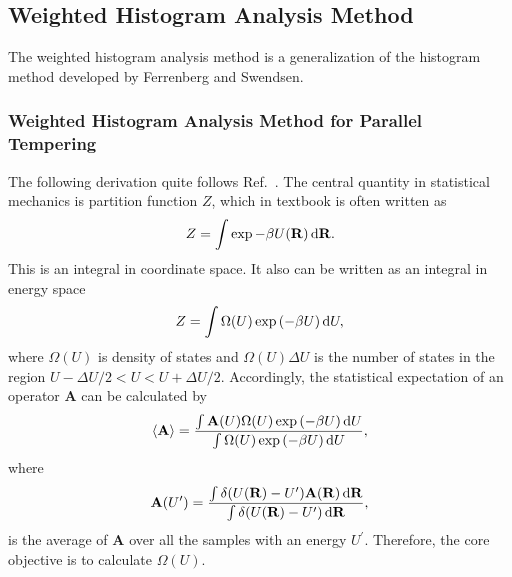 \subsection{Weighted Histogram Analysis Method\label{Sec:FEM:WHAM}}
The weighted histogram analysis method is a generalization of the histogram method developed by Ferrenberg and Swendsen.\cite{FerrenbergPRL1989}
\subsubsection{Weighted Histogram Analysis Method for Parallel Tempering\label{Sec:FEM:WHAM_REMD}}
The following derivation quite follows Ref.~\cite{ChoderaJCTC2007}.
The central quantity in statistical mechanics is partition function $Z$, which in textbook is often written as
\begin{equation}
Z=\int \exp{-\beta U(\mathbf{R})}\mathop{}\!\mathrm{d}\mathbf{R}.
\end{equation}
This is an integral in coordinate space. It also can be written as an integral in energy space
\begin{equation}
Z=\int \Omega(U)\exp{(-\beta U)}\mathop{}\!\mathrm{d} U,
\end{equation}
where $\Omega(U)$ is density of states and $\Omega(U)\Delta U$ is the number of states in the region $U-\Delta U/2<U<U+\Delta U/2$. Accordingly, the statistical expectation of an operator $\mathbf{A}$ can be calculated by
\begin{equation}
\langle \mathbf{A}\rangle=\frac {\int \mathbf{A}(U)\Omega(U)\exp{(-\beta U)}\mathop{}\!\mathrm{d} U}{\int \Omega(U)\exp{(-\beta U)}\mathop{}\!\mathrm{d} U},
\end{equation}
where
\begin{equation}
\mathbf{A}(U^\prime)=\frac{\int \delta (U(\mathbf{R})-U^\prime)\mathbf{A}(\mathbf{R})\mathop{}\!\mathrm{d} \mathbf{R}}{\int \delta (U(\mathbf{R})-U^\prime)\mathop{}\!\mathrm{d}\mathbf{R}},
\end{equation}
is the average of $\mathbf{A}$ over all the samples with an energy $U^\prime$. Therefore, the core objective is to calculate $\Omega(U)$.

